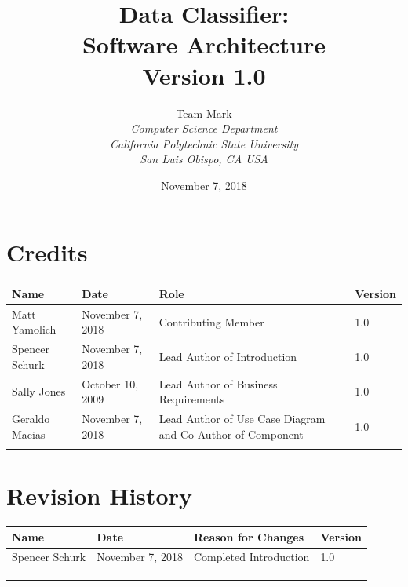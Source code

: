 \documentclass[12pt,oneside,letterpaper]{article}
\begin{document}
\title{\bfseries Data Classifier: \\
Software Architecture\\
Version 1.0}

\author {
\large{Team Mark}\\
\emph{Computer Science Department}\\
\emph{California Polytechnic State University}\\
\emph{San Luis Obispo, CA USA}\\
}

\date{November 7, 2018}
\maketitle \thispagestyle{empty}

\pagebreak
\tableofcontents



\section*{Credits}
\begin{tabular}{|l|l|p{2.5in}|l|}
\hline
\textbf{Name}&\textbf{Date}&\textbf{Role}&\textbf{Version}\\
\hline
Matt Yamolich &November 7, 2018&Contributing Member&1.0\\
\hline
Spencer Schurk&November 7, 2018&Lead Author of Introduction&1.0\\
\hline
Sally Jones&October 10, 2009&Lead Author of Business Requirements&1.0\\
\hline
Geraldo Macias&November 7, 2018&Lead Author of Use Case Diagram and Co-Author of Component&1.0\\
\hline
&&&\\
\hline
\end{tabular}

\section*{Revision History}
\begin{tabular}{|l|l|p{2.5in}|l|}
\hline
\textbf{Name}&\textbf{Date}&\textbf{Reason for Changes}&\textbf{Version}\\
\hline
Spencer Schurk&November 7, 2018&Completed Introduction&1.0\\
\hline
&&&\\
\hline
&&&\\
\hline
&&&\\
\hline
\end{tabular}
\end{document}
